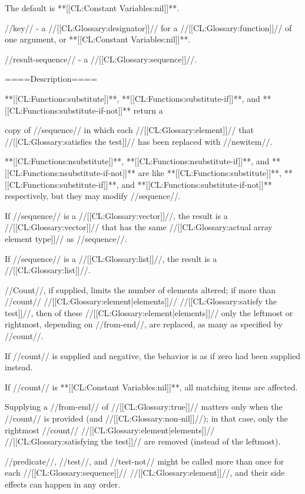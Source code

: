 The default is **[[CL:Constant Variables:nil]]**.

//key// - a //[[CL:Glossary:designator]]// for a //[[CL:Glossary:function]]// of one argument, or **[[CL:Constant Variables:nil]]**.

//result-sequence// - a //[[CL:Glossary:sequence]]//.

====Description====

**[[CL:Functions:substitute]]**, **[[CL:Functions:substitute-if]]**, and **[[CL:Functions:substitute-if-not]]** return a

copy of //sequence// in which each //[[CL:Glossary:element]]// that //[[CL:Glossary:satisfies the test]]// has been replaced with //newitem//.

**[[CL:Functions:nsubstitute]]**, **[[CL:Functions:nsubstitute-if]]**, and **[[CL:Functions:nsubstitute-if-not]]** are like **[[CL:Functions:substitute]]**, **[[CL:Functions:substitute-if]]**, and **[[CL:Functions:substitute-if-not]]** respectively, but they may modify //sequence//.

If //sequence// is a //[[CL:Glossary:vector]]//, the result is a //[[CL:Glossary:vector]]// that has the same //[[CL:Glossary:actual array element type]]// as //sequence//.

If //sequence// is a //[[CL:Glossary:list]]//, the result is a //[[CL:Glossary:list]]//.

//Count//, if supplied, limits the number of elements altered; if more than //count// //[[CL:Glossary:element|elements]]// //[[CL:Glossary:satisfy the test]]//, then of these //[[CL:Glossary:element|elements]]// only the leftmost or rightmost, depending on //from-end//, are replaced, as many as specified by //count//.

If //count// is supplied and negative, the behavior is as if zero had been supplied instead.

If //count// is **[[CL:Constant Variables:nil]]**, all matching items are affected.

Supplying a //from-end// of //[[CL:Glossary:true]]// matters only when the //count// is provided (and //[[CL:Glossary:non-nil]]//); in that case, only the rightmost //count// //[[CL:Glossary:element|elements]]// //[[CL:Glossary:satisfying the test]]// are removed (instead of the leftmost).

//predicate//, //test//, and //test-not// might be called more than once for each //[[CL:Glossary:sequence]]// //[[CL:Glossary:element]]//, and their side effects can happen in any order.

